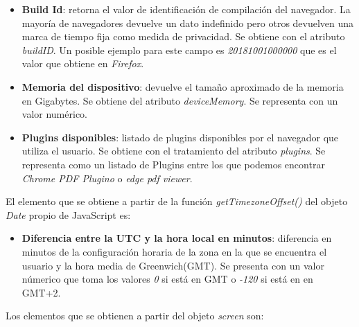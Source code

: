 \begin{itemize}
    \item \textbf{Build Id}: retorna el valor de identificación de compilación del navegador. La mayoría de navegadores devuelve un dato indefinido pero otros devuelven una marca de tiempo fija como medida de privacidad. Se obtiene con el atributo \textit{buildID}. Un posible ejemplo para este campo es \textit{20181001000000} que es el valor que obtiene en \textit{Firefox}. 
    \item \textbf{Memoria del dispositivo}: devuelve el tamaño aproximado de la memoria en Gigabytes. Se obtiene del atributo \textit{deviceMemory}. Se representa con un valor numérico.
     \item \textbf{Plugins disponibles}: listado de plugins disponibles por el navegador que utiliza el usuario. Se obtiene con el tratamiento del atributo \textit{plugins}. Se representa como un listado de Plugins entre los que podemos encontrar \textit{Chrome PDF Plugino} o \textit{edge pdf viewer}.
\end{itemize}
\noindent El elemento que se obtiene a partir de la función \textit{getTimezoneOffset()} del objeto \textit{Date} propio de JavaScript es:
\begin{itemize} 
    \item \textbf{Diferencia entre la UTC y la hora local en minutos}: diferencia en minutos de la configuración horaria de la zona en la que se encuentra el usuario y la hora media de Greenwich(GMT). Se presenta con un valor númerico que toma los valores \textit{0} si está en GMT o \textit{-120} si está en en GMT+2.
\end{itemize}
\noindent  Los elementos que se obtienen a partir del objeto \textit{screen}\cite{screen} son:
